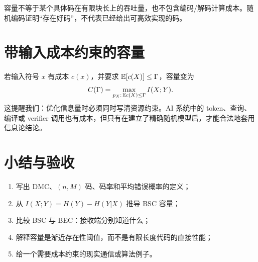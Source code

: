\begin{warningbox}
容量不等于某个具体码在有限块长上的吞吐量，也不包含编码/解码计算成本。随机编码证明“存在好码”，不代表已经给出可高效实现的码。
\end{warningbox}

\section{带输入成本约束的容量}

若输入符号 $x$ 有成本 $c(x)$，并要求 $\mathbb{E}[c(X)]\le\Gamma$，容量变为
\[
C(\Gamma)=\max_{p_X:\,\mathbb{E} c(X)\le\Gamma}I(X;Y).
\]
这提醒我们：优化信息量时必须同时写清资源约束。AI 系统中的 token、查询、编译或 verifier 调用也有成本，但只有在建立了精确随机模型后，才能合法地套用信息论结论。

\section{小结与验收}

\begin{checkpointbox}
\begin{enumerate}
  \item 写出 DMC、$(n,M)$ 码、码率和平均错误概率的定义；
  \item 从 $I(X;Y)=H(Y)-H(Y|X)$ 推导 BSC 容量；
  \item 比较 BSC 与 BEC：接收端分别知道什么；
  \item 解释容量是渐近存在性阈值，而不是有限长度代码的直接性能；
  \item 给一个需要成本约束的现实通信或算法例子。
\end{enumerate}
\end{checkpointbox}

